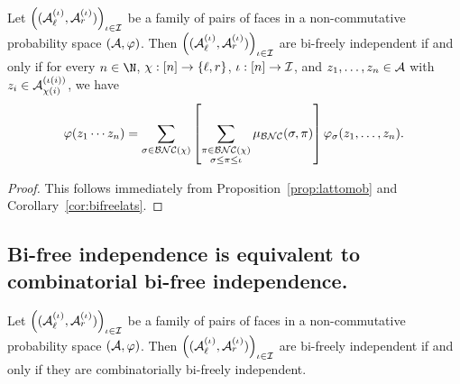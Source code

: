 \begin{corollary}
	\label{cor:bifreemob}
	Let $\left((\mathcal{A}_\ell^{(\iota)}, \mathcal{A}_r^{(\iota)})\right)_{\iota\in\mathcal{I}}$ be a family of pairs of faces in a non-commutative probability space $(\mathcal{A}, \varphi)$.
	Then $\left((\mathcal{A}_\ell^{(\iota)}, \mathcal{A}_r^{(\iota)})\right)_{\iota\in\mathcal{I}}$ are bi-freely independent if and only if for every $n \in \N$, $\chi : [n] \to \left\{\ell, r\right\}$, $\iota : [n] \to \mathcal{I}$, and $z_1, \ldots, z_n \in \mathcal{A}$ with $z_i \in \mathcal{A}_{\chi(i)}^{(\iota(i))}$, we have
	$$\varphi(z_1\cdots z_n)
	= \sum_{\sigma \in \mathcal{BNC}(\chi)}\left[\sum_{\substack{\pi \in \mathcal{BNC}(\chi) \\ \sigma \leq \pi \leq \iota}} \mu_{\mathcal{BNC}}(\sigma, \pi)\right] \varphi_\sigma(z_1, \ldots, z_n).$$
\end{corollary}
\begin{proof}
	This follows immediately from Proposition~\ref{prop:lattomob} and Corollary~\ref{cor:bifreelats}.
\end{proof}

\subsection{Bi-free independence is equivalent to combinatorial bi-free independence.}
\begin{theorem}
	\label{thm:biequiv}
	Let $\left((\mathcal{A}_\ell^{(\iota)}, \mathcal{A}_r^{(\iota)})\right)_{\iota\in\mathcal{I}}$ be a family of pairs of faces in a non-commutative probability space $(\mathcal{A}, \varphi)$.
	Then $\left((\mathcal{A}_\ell^{(\iota)}, \mathcal{A}_r^{(\iota)})\right)_{\iota\in\mathcal{I}}$ are bi-freely independent if and only if they are combinatorially bi-freely independent.
\end{theorem}

